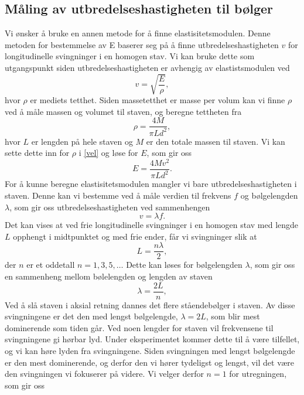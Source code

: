 \documentclass[%
 reprint,
 amsmath,amssymb,
 aps,
 norsk,
 booktabs
]{revtex4-1}
\begin{document}
\subsection{Måling av utbredelseshastigheten til bølger}\label{teori-b}
Vi ønsker å bruke en annen metode for å finne elastisitetsmodulen. Denne metoden for bestemmelse av E baserer seg på å finne utbredelseshastigheten $v$ for longitudinelle svingninger i en homogen stav. Vi kan bruke dette som utgangspunkt siden utbredelseshastigheten er avhengig av elastistsmodulen ved
\begin{equation}
  v = \sqrt{\frac{E}{\rho}},\label{vel}
\end{equation}
hvor $\rho$ er mediets tetthet. Siden massetetthet er masse per volum kan vi finne $\rho$ ved å måle massen og volumet til staven, og beregne tettheten fra
\begin{equation*}
  \rho = \frac{4M}{\pi L d^2},
\end{equation*}
hvor $L$ er lengden på hele staven og $M$ er den totale massen til staven. Vi kan sette dette inn for $\rho$ i \eqref{vel} og løse for $E$, som gir oss
\begin{equation}
  E = \frac{4Mv^2}{\pi L d^2}.\label{elast}
\end{equation}
For å kunne beregne elastisitetsmodulen mangler vi bare utbredelseshastigheten i staven. Denne kan vi bestemme ved å måle verdien til frekvens $f$ og bølgelengden $\lambda$, som gir oss utbredelseshastigheten ved sammenhengen
\begin{equation}
  v = \lambda f.\label{vlf}
\end{equation}
Det kan vises \cite{oppgave} at ved frie longitudinelle svingninger i en homogen stav med lengde $L$ opphengt i midtpunktet og med frie ender, får vi svingninger slik at
\begin{equation*}
  L = \frac{n\lambda}{2},
\end{equation*}
der $n$ er et oddetall $n = 1, 3, 5, \ldots$ Dette kan løses for bølgelengden $\lambda$, som gir oss en sammenheng mellom bølelengden og lengden av staven
\begin{equation*}
  \lambda = \frac{2L}{n},
\end{equation*}
Ved å slå staven i aksial retning dannes det flere ståendebølger i staven. Av disse svingningene er det den med lengst bølgelengde, $\lambda = 2L$, som blir mest dominerende som tiden går. Ved noen lengder for staven vil frekvensene til svingningene gi hørbar lyd. Under eksperimentet kommer dette til å være tilfellet, og vi kan høre lyden fra svingningene. Siden svingningen med lengst bølgelengde er den mest dominerende, og derfor den vi hører tydeligst og lengst, vil det være den svingningen vi fokuserer på videre. Vi velger derfor $n=1$ for utregningen, som gir oss
\end{document}
